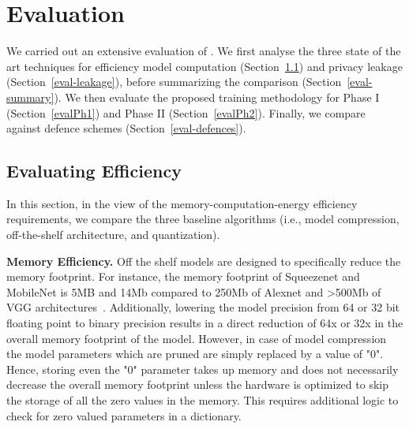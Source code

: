 \section{Evaluation}
\label{compare}

We carried out an extensive evaluation of \method.
We first analyse the three state of the art techniques for efficiency model computation (Section~\ref{eval-efficiency}) and privacy leakage (Section~\ref{eval-leakage}), before summarizing the comparison (Section~\ref{eval-summary}).
We then evaluate the proposed training methodology for Phase I (Section~\ref{evalPh1}) and Phase II (Section~\ref{evalPh2}).
Finally, we compare \method~ against defence schemes (Section~\ref{eval-defences}). %


\subsection{Evaluating Efficiency}
\label{eval-efficiency}

In this section, in the view of the memory-computation-energy efficiency requirements, we compare the three baseline algorithms (i.e., model compression, off-the-shelf architecture, and quantization).


\noindent\textbf{Memory Efficiency.} Off the shelf models are designed to specifically reduce the memory footprint.
For instance, the memory footprint of Squeezenet and MobileNet is 5MB and 14Mb compared to 250Mb of Alexnet and >500Mb of VGG architectures~\cite{DBLP:journals/corr/IandolaMAHDK16,conf/cvpr/SandlerHZZC18}.
Additionally, lowering the model precision from 64 or 32 bit floating point to binary precision results in a direct reduction of 64x or 32x in the overall memory footprint of the model.
However, in case of model compression the model parameters which are pruned are simply replaced by a value of "0".
Hence, storing even the "0" parameter takes up memory and does not necessarily decrease the overall memory footprint unless the hardware is optimized to skip the storage of all the zero values in the memory.
This requires additional logic to check for zero valued parameters in a dictionary.


